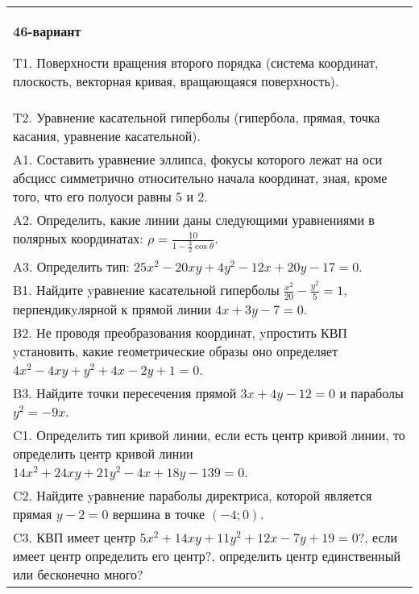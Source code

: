 \documentclass{article}
\begin{document}
\begin{tabular}{m{17cm}}
\textbf{46-вариант}
\newline

T1. Поверхности вращения второго порядка (система координат, плоскость, векторная кривая, вращающаяся поверхность).\\

T2. Уравнение касательной гиперболы (гипербола, прямая, точка касания, уравнение касательной).\\

A1. Составить уравнение эллипса, фокусы которого лежат на оси абсцисс симметрично относительно начала координат, зная, кроме того, что его полуоси равны 5 и 2.\\

A2. Определить, какие линии даны следующими уравнениями в полярных координатах: $\rho=\frac{10}{1-\frac{3}{2}\cos\theta}$.\\

A3. Определить тип: $25x^{2}-20xy+4y^{2}-12x+20y-17=0$.\\

B1. Найдите yравнение касательной гиперболы $\frac{x^{2}}{20} - \frac{y^{2}}{5} = 1$, перпендикyлярной к прямой линии $4x + 3y - 7 = 0$.  \\

B2. Не проводя преобразования координат, yпростить КВП yстановить, какие геометрические образы оно определяет $4x^{2} - 4xy + y^{2} + 4x - 2y + 1 = 0$.  \\

B3. Найдите точки пересечения прямой $3x + 4y - 12 = 0$ и параболы $y^{2} = - 9x$.  \\

C1. Определить тип кривой линии, если есть центр кривой линии, то определить центр кривой линии $14x^{2}+24xy+21y^{2}-4x+18y-139=0$.  \\

C2. Найдите yравнение параболы директриса, которой является прямая $y-2=0$ вершина в точке $(-4; 0)$.\\

C3. КВП имеет центр $5x^{2}+14xy+11y^{2}+12x-7y+19=0$?, если имеет центр определить его центр?, определить центр единственный или бесконечно много?  \\

\end{tabular}
\vspace{1cm}
\end{document}

